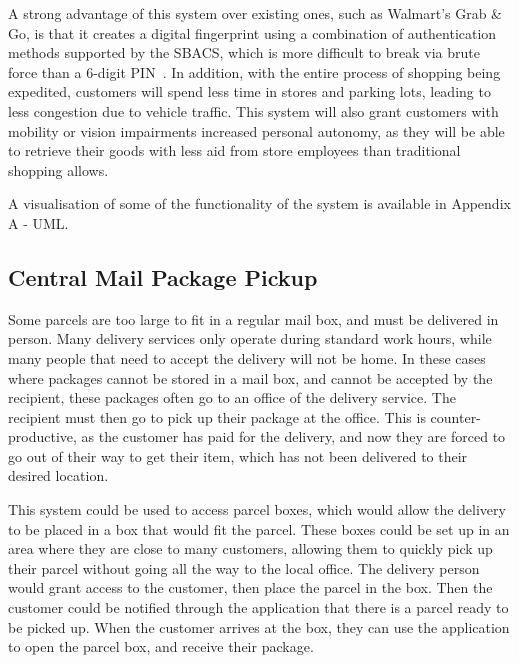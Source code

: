 \documentclass{article}
\begin{document}
A strong advantage of this system over existing ones, such as Walmart's Grab \& Go, is that it creates a digital 
fingerprint using a combination of authentication methods supported by the SBACS, which is more difficult to 
break via brute force than a 6-digit PIN~\autocite{WALMART}. In addition, with the entire process of shopping being 
expedited, customers will spend less time in stores and parking lots, leading to less congestion due to vehicle 
traffic. This system will also grant customers with mobility or vision impairments increased personal autonomy, as 
they will be able to retrieve their goods with less aid from store employees than traditional shopping allows. \hfill \break

\noindent A visualisation of some of the functionality of the system is available in Appendix A - UML.

\subsection{Central Mail Package Pickup}

Some parcels are too large to fit in a regular mail box, and must be delivered in person. Many delivery services only 
operate during standard work hours, while many people that need to accept the delivery will not be home. In these cases 
where packages cannot be stored in a mail box, and cannot be accepted by the recipient, these packages often go to an office 
of the delivery service. The recipient must then go to pick up their package at the office. This is counter-productive, 
as the customer has paid for the delivery, and now they are forced to go out of their way to get their item, which has not 
been delivered to their desired location.

This system could be used to access parcel boxes, which would allow the delivery to be placed in a box that would fit 
the parcel. These boxes could be set up in an area where they are close to many customers, allowing them to quickly 
pick up their parcel without going all the way to the local office. The delivery person would grant access to the 
customer, then place the parcel in the box. Then the customer could be notified through the application that there is a 
parcel ready to be picked up. When the customer arrives at the box, they can use the application to open the parcel 
box, and receive their package.
\end{document}
